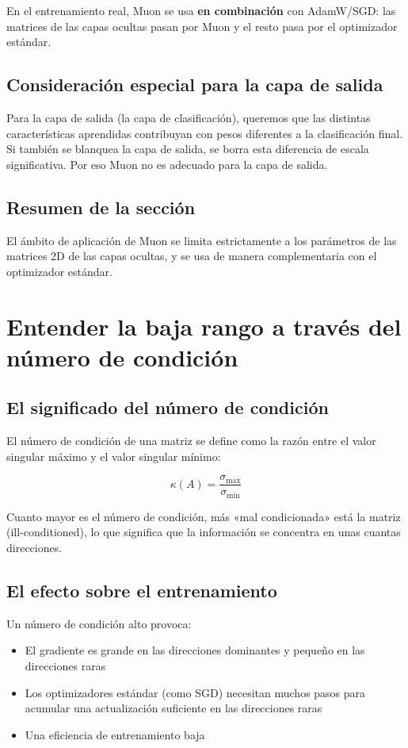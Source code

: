 \documentclass[a4paper]{article}
\begin{document}
En el entrenamiento real, Muon se usa \textbf{en combinación} con AdamW/SGD: las matrices de las capas ocultas pasan por Muon y el resto pasa por el optimizador estándar.

\subsection{Consideración especial para la capa de salida}

Para la capa de salida (la capa de clasificación), queremos que las distintas características aprendidas contribuyan con pesos diferentes a la clasificación final. Si también se blanquea la capa de salida, se borra esta diferencia de escala significativa. Por eso Muon no es adecuado para la capa de salida.

\subsection{Resumen de la sección}

El ámbito de aplicación de Muon se limita estrictamente a los parámetros de las matrices 2D de las capas ocultas, y se usa de manera complementaria con el optimizador estándar.

\section{Entender la baja rango a través del número de condición}

\subsection{El significado del número de condición}

El número de condición de una matriz se define como la razón entre el valor singular máximo y el valor singular mínimo:

$$
\kappa(A) = \frac{\sigma_{\max}}{\sigma_{\min}}
$$

Cuanto mayor es el número de condición, más «mal condicionada» está la matriz (ill-conditioned), lo que significa que la información se concentra en unas cuantas direcciones.

\subsection{El efecto sobre el entrenamiento}

Un número de condición alto provoca:
\begin{itemize}
  \item El gradiente es grande en las direcciones dominantes y pequeño en las direcciones raras
  \item Los optimizadores estándar (como SGD) necesitan muchos pasos para acumular una actualización suficiente en las direcciones raras
  \item Una eficiencia de entrenamiento baja
\end{itemize}
\end{document}

